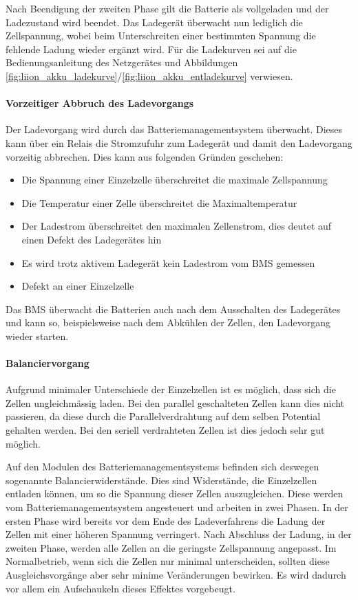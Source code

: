 Nach Beendigung der zweiten Phase gilt die Batterie als vollgeladen und der Ladezustand wird beendet. Das Ladegerät überwacht nun lediglich die Zellspannung, wobei beim Unterschreiten einer bestimmten Spannung die fehlende Ladung wieder ergänzt wird. Für die Ladekurven sei auf die Bedienungsanleitung des Netzgerätes \cite{ladegeraet} und Abbildungen \ref{fig:liion_akku_ladekurve}/\ref{fig:liion_akku_entladekurve} verwiesen.

\paragraph{Vorzeitiger Abbruch des Ladevorgangs}
Der Ladevorgang wird durch das Batteriemanagementsystem überwacht. Dieses kann über ein Relais die Stromzufuhr zum Ladegerät und damit den Ladevorgang vorzeitig abbrechen. Dies kann aus folgenden Gründen geschehen:
\newpage
\begin{itemize}
	\item Die Spannung einer Einzelzelle überschreitet die maximale Zellspannung
	\item Die Temperatur einer Zelle überschreitet die Maximaltemperatur
	\item Der Ladestrom überschreitet den maximalen Zellenstrom, dies deutet auf einen Defekt des Ladegerätes hin
	\item Es wird trotz aktivem Ladegerät kein Ladestrom vom BMS gemessen
	\item Defekt an einer Einzelzelle
\end{itemize}
Das BMS überwacht die Batterien auch nach dem Ausschalten des Ladegerätes und kann so, beispielsweise nach dem Abkühlen der Zellen, den Ladevorgang wieder starten.

\paragraph{Balanciervorgang}
Aufgrund minimaler Unterschiede der Einzelzellen ist es möglich, dass sich die Zellen ungleichmässig laden. Bei den parallel geschalteten Zellen kann dies nicht passieren, da diese durch die Parallelverdrahtung auf dem selben Potential gehalten werden. Bei den seriell verdrahteten Zellen ist dies jedoch sehr gut möglich.

Auf den Modulen des Batteriemanagementsystems befinden sich deswegen sogenannte Balancierwiderstände. Dies sind Widerstände, die Einzelzellen entladen können, um so die Spannung dieser Zellen auszugleichen. Diese werden vom Batteriemanagementsystem angesteuert und arbeiten in zwei Phasen. In der ersten Phase wird bereits vor dem Ende des Ladeverfahrens die Ladung der Zellen mit einer höheren Spannung verringert. Nach Abschluss der Ladung, in der zweiten Phase, werden alle Zellen an die geringste Zellspannung angepasst. Im Normalbetrieb, wenn sich die Zellen nur minimal unterscheiden, sollten diese Ausgleichsvorgänge aber sehr minime Veränderungen bewirken. Es wird dadurch vor allem ein Aufschaukeln dieses Effektes vorgebeugt.